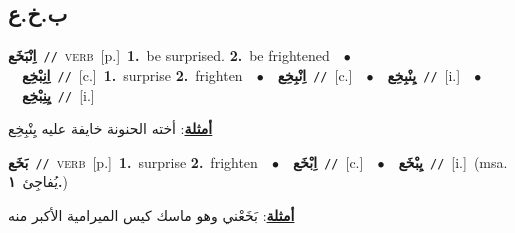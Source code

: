 \documentclass[10pt,a4paper,twoside]{article} %
\begin{document}
\begin{multicols}{2}
\vspace{-3mm}
\subsection*{\color{blue}\foreignlanguage{arabic}{ب.خ.ع}\color{blue}{}} 

{\setlength\topsep{0pt}\textbf{\foreignlanguage{arabic}{اِنْبَخَع}}\ {\color{gray}\texttt{//}\color{black}}\ \textsc{verb}\ [p.]\ \textbf{1.}~be surprised.  \textbf{2.}~be frightened\ \ $\bullet$\ \ \setlength\topsep{0pt}\textbf{\foreignlanguage{arabic}{اِنِبْخِع}}\ {\color{gray}\texttt{//}\color{black}}\ [c.]\ \textbf{1.}~surprise  \textbf{2.}~frighten\ \ $\bullet$\ \ \setlength\topsep{0pt}\textbf{\foreignlanguage{arabic}{اِنْبِخِع}}\ {\color{gray}\texttt{//}\color{black}}\ [c.]\ \ $\bullet$\ \ \setlength\topsep{0pt}\textbf{\foreignlanguage{arabic}{يِنْبِخِع}}\ {\color{gray}\texttt{//}\color{black}}\ [i.]\ \ $\bullet$\ \ \setlength\topsep{0pt}\textbf{\foreignlanguage{arabic}{يِنِبْخِع}}\ {\color{gray}\texttt{//}\color{black}}\ [i.]\  \begin{flushright}\color{gray}\foreignlanguage{arabic}{\textbf{\underline{\foreignlanguage{arabic}{أمثلة}}}: أخته الحنونة خايفة عليه يِنْبِخِع}\end{flushright}\color{black}} \vspace{2mm}

{\setlength\topsep{0pt}\textbf{\foreignlanguage{arabic}{بَخَع}}\ {\color{gray}\texttt{//}\color{black}}\ \textsc{verb}\ [p.]\ \textbf{1.}~surprise  \textbf{2.}~frighten\ \ $\bullet$\ \ \setlength\topsep{0pt}\textbf{\foreignlanguage{arabic}{اِبْخَع}}\ {\color{gray}\texttt{//}\color{black}}\ [c.]\ \ $\bullet$\ \ \setlength\topsep{0pt}\textbf{\foreignlanguage{arabic}{يِبْخَع}}\ {\color{gray}\texttt{//}\color{black}}\ [i.]\ \color{gray}(msa. \foreignlanguage{arabic}{يُفاجِئ}~\foreignlanguage{arabic}{\textbf{١.}})\color{black}\  \begin{flushright}\color{gray}\foreignlanguage{arabic}{\textbf{\underline{\foreignlanguage{arabic}{أمثلة}}}: بَخَعْني وهو ماسك كيس الميرامية الأكبر منه}\end{flushright}\color{black}} \vspace{2mm}


\end{multicols}
\end{document}
